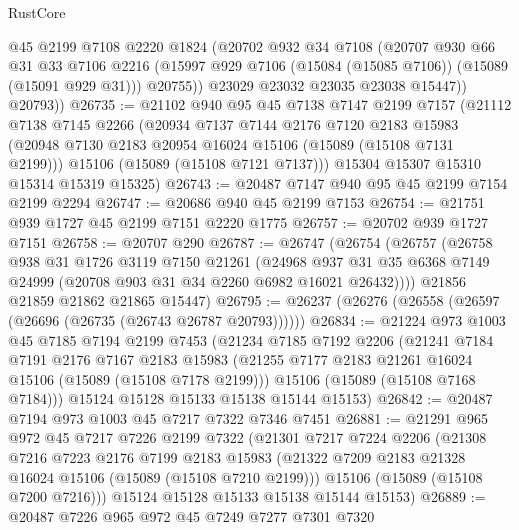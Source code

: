 \begin{lexlean}{RustCore}
\begin{coremodule}
            @45
            @2199
            @7108
            @2220
            @1824
            (@20702
              @932
              @34
              @7108
              (@20707
                @930
                @66
                @31
                @33
                @7106
                @2216
                (@15997 @929 @7106 (@15084 (@15085 @7106)) (@15089 (@15091 @929 @31)))
                @20755))
            @23029
            @23032
            @23035
            @23038
            @15447))
        @20793))
@26735 := @21102
    @940
    @95
    @45
    @7138
    @7147
    @2199
    @7157
    (@21112
      @7138
      @7145
      @2266
      (@20934
        @7137
        @7144
        @2176
        @7120
        @2183
        @15983
        (@20948 @7130 @2183 @20954 @16024 @15106 (@15089 (@15108 @7131 @2199)))
        @15106
        (@15089 (@15108 @7121 @7137)))
      @15304
      @15307
      @15310
      @15314
      @15319
      @15325)
@26743 := @20487 @7147 @940 @95 @45 @2199 @7154 @2199 @2294
@26747 := @20686 @940 @45 @2199 @7153
@26754 := @21751 @939 @1727 @45 @2199 @7151 @2220 @1775
@26757 := @20702 @939 @1727 @7151
@26758 := @20707 @290
@26787 := @26747
    (@26754
      (@26757
        (@26758
          @938
          @31
          @1726
          @3119
          @7150
          @21261
          (@24968 @937 @31 @35 @6368 @7149 @24999 (@20708 @903 @31 @34 @2260 @6982 @16021 @26432))))
      @21856
      @21859
      @21862
      @21865
      @15447)
@26795 := @26237 (@26276 (@26558 (@26597 (@26696 (@26735 (@26743 @26787 @20793))))))
@26834 := @21224
    @973
    @1003
    @45
    @7185
    @7194
    @2199
    @7453
    (@21234
      @7185
      @7192
      @2206
      (@21241
        @7184
        @7191
        @2176
        @7167
        @2183
        @15983
        (@21255 @7177 @2183 @21261 @16024 @15106 (@15089 (@15108 @7178 @2199)))
        @15106
        (@15089 (@15108 @7168 @7184)))
      @15124
      @15128
      @15133
      @15138
      @15144
      @15153)
@26842 := @20487 @7194 @973 @1003 @45 @7217 @7322 @7346 @7451
@26881 := @21291
    @965
    @972
    @45
    @7217
    @7226
    @2199
    @7322
    (@21301
      @7217
      @7224
      @2206
      (@21308
        @7216
        @7223
        @2176
        @7199
        @2183
        @15983
        (@21322 @7209 @2183 @21328 @16024 @15106 (@15089 (@15108 @7210 @2199)))
        @15106
        (@15089 (@15108 @7200 @7216)))
      @15124
      @15128
      @15133
      @15138
      @15144
      @15153)
@26889 := @20487 @7226 @965 @972 @45 @7249 @7277 @7301 @7320

\end{coremodule}
\end{lexlean}
